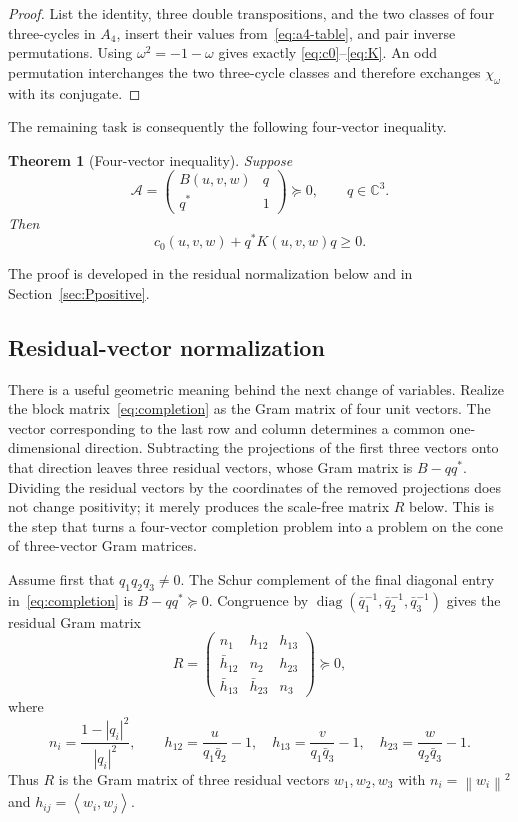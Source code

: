\documentclass[11pt]{article}
\newtheorem{theorem}{Theorem}[section]
\theoremstyle{definition}
\newcommand{\CC}{\mathbb C}
\newcommand{\diag}{\operatorname{diag}}
\newcommand{\ip}[2]{\left\langle #1,#2\right\rangle}
\newcommand{\norm}[1]{\left\lVert #1\right\rVert}
\newcommand{\mat}[1]{\begin{pmatrix}#1\end{pmatrix}}
\newcommand{\psd}{\succeq 0}
\begin{document}
\begin{proof}
List the identity, three double transpositions, and the two classes of four
three-cycles in $A_4$, insert their values from~\eqref{eq:a4-table}, and pair
inverse permutations.  Using $\omega^2=-1-\omega$ gives exactly
\eqref{eq:c0}--\eqref{eq:K}.  An odd permutation interchanges the two
three-cycle classes and therefore exchanges $\chi_\omega$ with its conjugate.
\end{proof}

The remaining task is consequently the following four-vector inequality.

\begin{theorem}[Four-vector inequality]\label{thm:four-vector}
Suppose
\begin{equation}\label{eq:completion}
 \mathcal A=\mat{B(u,v,w)&q\\q^*&1}\psd,\qquad q\in\CC^3.
\end{equation}
Then
\begin{equation}\label{eq:four-vector}
 c_0(u,v,w)+q^*K(u,v,w)q\geq0.
\end{equation}
\end{theorem}

The proof is developed in the residual normalization below and in
Section~\ref{sec:Ppositive}.

\subsection{Residual-vector normalization}\label{sec:normalization}

There is a useful geometric meaning behind the next change of variables.
Realize the block matrix~\eqref{eq:completion} as the Gram matrix of four unit
vectors.  The vector corresponding to the last row and column determines a
common one-dimensional direction.  Subtracting the projections of the first
three vectors onto that direction leaves three residual vectors, whose Gram
matrix is $B-qq^*$.  Dividing the residual vectors by the coordinates of the
removed projections does not change positivity; it merely produces the
scale-free matrix $R$ below.  This is the step that turns a four-vector
completion problem into a problem on the cone of three-vector Gram matrices.

Assume first that $q_1q_2q_3\neq0$.  The Schur complement of the final
diagonal entry in~\eqref{eq:completion} is
$B-qq^*\psd$.  Congruence by
$\diag(\bar q_1^{-1},\bar q_2^{-1},\bar q_3^{-1})$ gives the residual Gram
matrix
\begin{equation}\label{eq:residual-gram}
 R=\mat{
 n_1&h_{12}&h_{13}\\
 \bar h_{12}&n_2&h_{23}\\
 \bar h_{13}&\bar h_{23}&n_3
 }\psd,
\end{equation}
where
\begin{equation}\label{eq:residual-coordinates}
 n_i=\frac{1-|q_i|^2}{|q_i|^2},\qquad
 h_{12}=\frac{u}{q_1\bar q_2}-1,\quad
 h_{13}=\frac{v}{q_1\bar q_3}-1,\quad
 h_{23}=\frac{w}{q_2\bar q_3}-1.
\end{equation}
Thus $R$ is the Gram matrix of three residual vectors $w_1,w_2,w_3$ with
$n_i=\norm{w_i}^2$ and $h_{ij}=\ip{w_i}{w_j}$.
\end{document}
